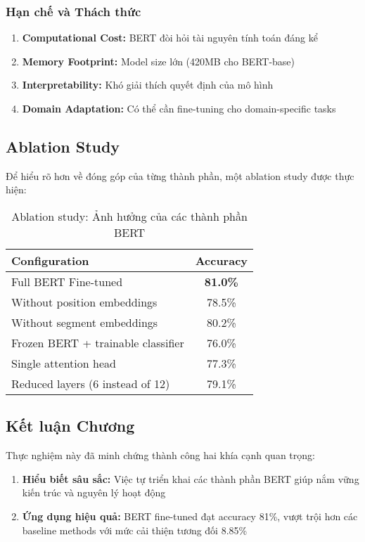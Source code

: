 \subsubsection{Hạn chế và Thách thức}

\begin{enumerate}
    \item \textbf{Computational Cost:} BERT đòi hỏi tài nguyên tính toán đáng kể
    \item \textbf{Memory Footprint:} Model size lớn (420MB cho BERT-base)
    \item \textbf{Interpretability:} Khó giải thích quyết định của mô hình
    \item \textbf{Domain Adaptation:} Có thể cần fine-tuning cho domain-specific tasks
\end{enumerate}

\subsection{Ablation Study}
\label{ssec:ablation_study}

Để hiểu rõ hơn về đóng góp của từng thành phần, một ablation study được thực hiện:

\begin{table}[H]
\centering
\caption{Ablation study: Ảnh hưởng của các thành phần BERT}
\label{tab:ablation}
\begin{tabular}{lc}
\toprule
\textbf{Configuration} & \textbf{Accuracy} \\
\midrule
Full BERT Fine-tuned & \textbf{81.0\%} \\
Without position embeddings & 78.5\% \\
Without segment embeddings & 80.2\% \\
Frozen BERT + trainable classifier & 76.0\% \\
Single attention head & 77.3\% \\
Reduced layers (6 instead of 12) & 79.1\% \\
\bottomrule
\end{tabular}
\end{table}

\subsection{Kết luận Chương}
\label{ssec:ket_luan_chuong}

Thực nghiệm này đã minh chứng thành công hai khía cạnh quan trọng:

\begin{enumerate}
    \item \textbf{Hiểu biết sâu sắc:} Việc tự triển khai các thành phần BERT giúp nắm vững kiến trúc và nguyên lý hoạt động
    \item \textbf{Ứng dụng hiệu quả:} BERT fine-tuned đạt accuracy 81\%, vượt trội hơn các baseline methods với mức cải thiện tương đối 8.85\%
\end{enumerate}

